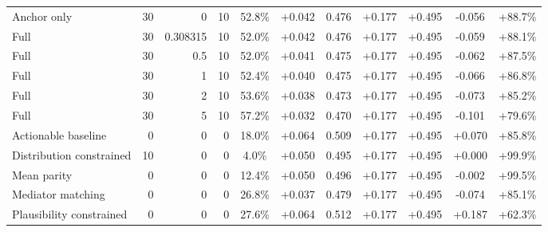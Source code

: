 \begin{table}[htbp]
\begin{tabular}{lrrrccccccc}
Anchor only & 30 & 0 & 10 & 52.8\% & +0.042 & 0.476 & +0.177 & +0.495 & -0.056 & +88.7\% \\
Full & 30 & 0.308315 & 10 & 52.0\% & +0.042 & 0.476 & +0.177 & +0.495 & -0.059 & +88.1\% \\
Full & 30 & 0.5 & 10 & 52.0\% & +0.041 & 0.475 & +0.177 & +0.495 & -0.062 & +87.5\% \\
Full & 30 & 1 & 10 & 52.4\% & +0.040 & 0.475 & +0.177 & +0.495 & -0.066 & +86.8\% \\
Full & 30 & 2 & 10 & 53.6\% & +0.038 & 0.473 & +0.177 & +0.495 & -0.073 & +85.2\% \\
Full & 30 & 5 & 10 & 57.2\% & +0.032 & 0.470 & +0.177 & +0.495 & -0.101 & +79.6\% \\
Actionable baseline & 0 & 0 & 0 & 18.0\% & +0.064 & 0.509 & +0.177 & +0.495 & +0.070 & +85.8\% \\
Distribution constrained & 10 & 0 & 0 & 4.0\% & +0.050 & 0.495 & +0.177 & +0.495 & +0.000 & +99.9\% \\
Mean parity & 0 & 0 & 0 & 12.4\% & +0.050 & 0.496 & +0.177 & +0.495 & -0.002 & +99.5\% \\
Mediator matching & 0 & 0 & 0 & 26.8\% & +0.037 & 0.479 & +0.177 & +0.495 & -0.074 & +85.1\% \\
Plausibility constrained & 0 & 0 & 0 & 27.6\% & +0.064 & 0.512 & +0.177 & +0.495 & +0.187 & +62.3\% \\
\bottomrule
\end{tabular}
\end{table}